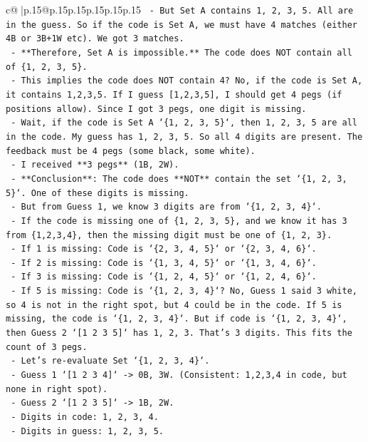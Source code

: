 \documentclass{article}
\begin{document}
{\begin{supertabular}{c@{$\;$}|p{.15\linewidth}@{}p{.15\linewidth}p{.15\linewidth}p{.15\linewidth}p{.15\linewidth}p{.15\linewidth}}
{{{\texttt{  {-} But Set A contains 1, 2, 3, 5. All are in the guess. So if the code is Set A, we must have 4 matches (either 4B or 3B+1W etc). We got 3 matches.} \\
\texttt{  {-} **Therefore, Set A is impossible.** The code does NOT contain all of \{1, 2, 3, 5\}.} \\
\texttt{  {-} This implies the code does NOT contain 4? No, if the code is Set A, it contains 1,2,3,5. If I guess {[}1,2,3,5{]}, I should get 4 pegs (if positions allow). Since I got 3 pegs, one digit is missing.} \\
\texttt{  {-} Wait, if the code is Set A `\{1, 2, 3, 5\}`, then 1, 2, 3, 5 are all in the code. My guess has 1, 2, 3, 5. So all 4 digits are present. The feedback must be 4 pegs (some black, some white).} \\
\texttt{  {-} I received **3 pegs** (1B, 2W).} \\
\texttt{  {-} **Conclusion**: The code does **NOT** contain the set `\{1, 2, 3, 5\}`. One of these digits is missing.} \\
\texttt{  {-} But from Guess 1, we know 3 digits are from `\{1, 2, 3, 4\}`.} \\
\texttt{  {-} If the code is missing one of \{1, 2, 3, 5\}, and we know it has 3 from \{1,2,3,4\}, then the missing digit must be one of \{1, 2, 3\}.} \\
\texttt{  {-} If 1 is missing: Code is `\{2, 3, 4, 5\}` or `\{2, 3, 4, 6\}`.} \\
\texttt{  {-} If 2 is missing: Code is `\{1, 3, 4, 5\}` or `\{1, 3, 4, 6\}`.} \\
\texttt{  {-} If 3 is missing: Code is `\{1, 2, 4, 5\}` or `\{1, 2, 4, 6\}`.} \\
\texttt{  {-} If 5 is missing: Code is `\{1, 2, 3, 4\}`? No, Guess 1 said 3 white, so 4 is not in the right spot, but 4 could be in the code. If 5 is missing, the code is `\{1, 2, 3, 4\}`. But if code is `\{1, 2, 3, 4\}`, then Guess 2 `{[}1 2 3 5{]}` has 1, 2, 3. That's 3 digits. This fits the count of 3 pegs.} \\
\texttt{    {-} Let's re{-}evaluate Set `\{1, 2, 3, 4\}`.} \\
\texttt{    {-} Guess 1 `{[}1 2 3 4{]}` {-}> 0B, 3W. (Consistent: 1,2,3,4 in code, but none in right spot).} \\
\texttt{    {-} Guess 2 `{[}1 2 3 5{]}` {-}> 1B, 2W.} \\
\texttt{      {-} Digits in code: 1, 2, 3, 4.} \\
\texttt{      {-} Digits in guess: 1, 2, 3, 5.} \\
}}}
\end{supertabular}}
\end{document}
